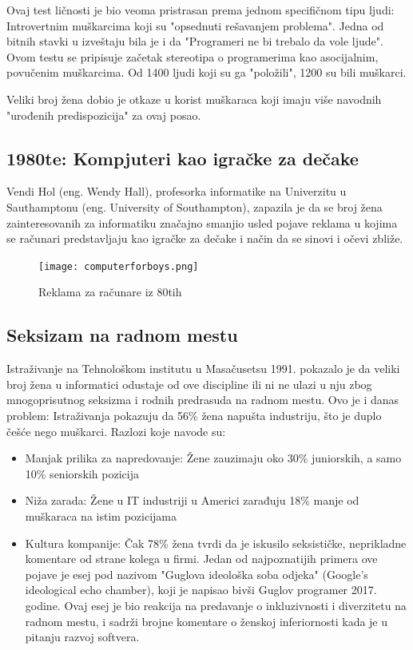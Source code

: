 \documentclass[12pt]{article}
\begin{document}
Ovaj test ličnosti je bio veoma pristrasan prema jednom specifičnom tipu ljudi: Introvertnim muškarcima koji su "opsednuti rešavanjem problema". Jedna od bitnih stavki u izveštaju bila je i da "Programeri ne bi trebalo da vole ljude". Ovom testu se pripisuje začetak stereotipa o programerima  kao asocijalnim, povučenim muškarcima. Od 1400 ljudi koji su ga "položili", 1200 su bili muškarci.

Veliki broj žena dobio je otkaze u korist muškaraca koji imaju više navodnih "urođenih predispozicija" za ovaj posao. 

\subsection{1980te: Kompjuteri kao igračke za dečake}

Vendi Hol (eng. Wendy Hall), profesorka informatike na Univerzitu u Sauthamptonu (eng. University of Southampton), zapazila je da se broj žena zainteresovanih za informatiku značajno smanjio usled pojave reklama u kojima se računari predstavljaju kao igračke za dečake i način da se sinovi i očevi zbliže.

\begin{figure}[htp]
    \centering
    \texttt{[image: computerforboys.png]}
    \caption{Reklama za računare iz 80tih}
    \label{fig:enter-label}
\end{figure}

\subsection{Seksizam na radnom mestu}

Istraživanje na Tehnološkom institutu u Masačusetsu 1991. pokazalo je da veliki broj žena u informatici odustaje od ove discipline ili ni ne ulazi u nju zbog mnogoprisutnog seksizma i rodnih predrasuda na radnom mestu. Ovo je i danas problem: Istraživanja pokazuju da 56\% žena napušta industriju, što je duplo češće nego muškarci. Razlozi koje navode su: 

\begin{itemize}
    \item Manjak prilika za napredovanje: Žene zauzimaju oko 30\% juniorskih, a samo 10\% seniorskih pozicija
    \item Niža zarada: Žene u IT industriji u Americi zarađuju 18\% manje od muškaraca na istim pozicijama
    \item Kultura kompanije: Čak 78\% žena tvrdi da je iskusilo seksističke, neprikladne komentare od strane kolega u firmi. Jedan od najpoznatijih primera ove pojave je esej pod nazivom "Guglova ideološka soba odjeka" (Google's ideological echo chamber), koji je napisao bivši Guglov programer 2017. godine. Ovaj esej je bio reakcija na predavanje o inkluzivnosti i diverzitetu na radnom mestu, i sadrži brojne komentare o ženskoj inferiornosti kada je u pitanju razvoj softvera. 
\end{itemize}
\end{document}
